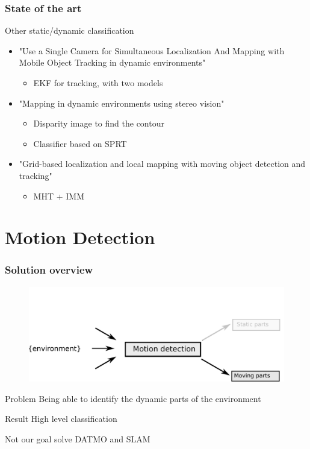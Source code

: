 \documentclass{beamer}
\begin{document}
	\begin{frame}
		\frametitle{State of the art}
		
		\begin{block}{Other static/dynamic classification}
			\begin{itemize}
			\item "Use a Single Camera for Simultaneous Localization And Mapping with  Mobile Object Tracking in dynamic environments" \cite{Migliore_2009_ICRA}
				\begin{itemize}			
				\item EKF for tracking, with two models				
				\end{itemize}		
			\item "Mapping in dynamic environments using stereo vision" \cite{DBLP:conf/ivs/LategahnGHKE11}
				\begin{itemize}
				\item Disparity image to find the contour
				\item Classifier based on SPRT				
				\end{itemize}		
			\item "Grid-based localization and local mapping with moving object detection and tracking" \cite{Vu201158}
				\begin{itemize}			
				\item MHT + IMM			
				\end{itemize}	
			\end{itemize}		
		\end{block}
	\end{frame}

\section{Motion Detection}

	\begin{frame}
		\frametitle{Solution overview}
		\begin{figure}[h]
			\center
			\includegraphics[scale=0.5]{img/fig:problem}
		 \end{figure}
		 
		\begin{block}{Problem}
			 Being able to identify the dynamic parts of the environment
		\end{block}
		 
		\begin{block}{Result}
			High level classification
		\end{block}				 

		\begin{alertblock}{Not our goal}
			solve DATMO and SLAM
		\end{alertblock}
	\end{frame}
\end{document}

